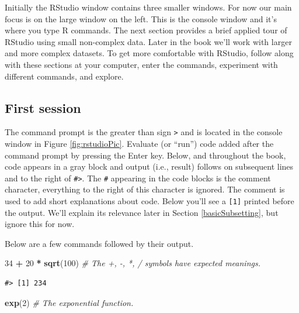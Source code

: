 \documentclass[
  11pt,
]{krantz}
\newenvironment{Shaded}{\begin{snugshade}}{\end{snugshade}}
\newcommand{\CommentTok}[1]{\textcolor[rgb]{0.56,0.35,0.01}{\textit{#1}}}
\newcommand{\DecValTok}[1]{\textcolor[rgb]{0.00,0.00,0.81}{#1}}
\newcommand{\KeywordTok}[1]{\textcolor[rgb]{0.13,0.29,0.53}{\textbf{#1}}}
\newcommand{\NormalTok}[1]{#1}
\newcommand{\OperatorTok}[1]{\textcolor[rgb]{0.81,0.36,0.00}{\textbf{#1}}}
\newcommand{\StringTok}[1]{\textcolor[rgb]{0.31,0.60,0.02}{#1}}
\theoremstyle{definition}
\theoremstyle{definition}
\theoremstyle{definition}
\theoremstyle{definition}
\theoremstyle{remark}
\begin{document}
Initially the RStudio window contains three smaller windows. For now our main focus is on the large window on the left. This is the console window and it's where you type R commands. The next section provides a brief applied tour of RStudio using small non-complex data. Later in the book we'll work with larger and more complex datasets. To get more comfortable with RStudio, follow along with these sections at your computer, enter the commands, experiment with different commands, and explore.

\hypertarget{RDescriptive}{%
\subsection{First session}\label{RDescriptive}}

The command prompt is the greater than sign \texttt{\textgreater{}} and is located in the console window in Figure \ref{fig:rstudioPic}. Evaluate (or ``run'') code added after the command prompt by pressing the Enter key. Below, and throughout the book, code appears in a gray block and output (i.e., result) follows on subsequent lines and to the right of \texttt{\#\textgreater{}}. The \texttt{\#} appearing in the code blocks is the comment character, everything to the right of this character is ignored. The comment is used to add short explanations about code. Below you'll see a \texttt{{[}1{]}} printed before the output. We'll explain its relevance later in Section \ref{basicSubsetting}, but ignore this for now.

Below are a few commands followed by their output.

\begin{Shaded}
\begin{Highlighting}[]
\DecValTok{34} \OperatorTok{+}\StringTok{ }\DecValTok{20} \OperatorTok{*}\StringTok{ }\KeywordTok{sqrt}\NormalTok{(}\DecValTok{100}\NormalTok{)  }\CommentTok{\# The +, {-}, *, / symbols have expected meanings.}
\end{Highlighting}
\end{Shaded}

\begin{verbatim}
#> [1] 234
\end{verbatim}

\begin{Shaded}
\begin{Highlighting}[]
\KeywordTok{exp}\NormalTok{(}\DecValTok{2}\NormalTok{)  }\CommentTok{\# The exponential function.}
\end{Highlighting}
\end{Shaded}
\end{document}
